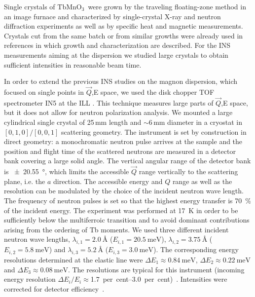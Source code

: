 \documentclass[aps,prb,twocolumn,superscriptaddress,showpacs,floatfix]{revtex4-2}
\newcommand{\tbmno}{TbMnO$_3$}
\begin{document}
Single crystals of \tbmno \ were grown by the traveling floating-zone method in an image furnace \cite{Reutler2003,diss_komarek} and characterized by single-crystal X-ray \cite{struc-baum} and neutron diffraction experiments as well as by specific heat and magnetic measurements. Crystals cut from the same batch or from similar growths were already used in references  in which growth and characterization are described. For the INS measurements aiming at the dispersion we studied large
crystals to obtain sufficient intensities in reasonable beam time.

In order to extend the previous INS studies on the magnon dispersion, which focused on single points in $\vec{Q}$,E space, we used  the disk chopper TOF spectrometer IN5 at the ILL \cite{data-4-01-1230}.
This technique measures large parts of $\vec{Q}$,E space, but it does not allow for neutron polarization analysis.
We mounted a large cylindrical single crystal of 25\,mm length and $\sim$6\,mm diameter in a cryostat in $[0,1,0]/[0,0,1]$ scattering geometry.
The instrument is set by construction in direct geometry: a monochromatic neutron pulse arrives at the sample and the position and flight time of the scattered neutrons are measured in a  detector bank covering a large solid angle. The vertical angular range of the detector bank is \SI{\pm20.55}{\degree}, which limits the accessible $\vec{Q}$ range vertically to the scattering plane, i.e. the $a$ direction.
The accessible energy and $Q$ range as well as the resolution can be modulated by the choice of the incident neutron wave length. The frequency of neutron pulses is set so that the highest energy transfer is \SI{70}{\percent} of the incident energy. The experiment was performed at \SI{17}{\kelvin} in order to be sufficiently below the multiferroic transition and to avoid dominant contributions arising from the ordering of Tb moments. We used three different incident neutron wave lengths, $\lambda_{i,1}=\SI{2.0}{\angstrom}$ ($E_{i,1}=\SI{20.5}{\meV}$), $\lambda_{i,2}=\SI{3.75}{\angstrom}$ ($E_{i,2}=\SI{5.8}{\meV}$) and $\lambda_{i,3}=\SI{5.2}{\angstrom}$ ($E_{i,3}=\SI{3.0}{\meV}$). The corresponding energy resolutions determined at the elastic line were $\Delta E_1\approx\SI{0.84}{\meV}$, $\Delta E_2\approx\SI{0.22}{\meV}$ and $\Delta E_3\approx\SI{0.08}{\meV}$. The resolutions are typical for this instrument (incoming energy resolution $\Delta E_i/E_i\approx$\SIrange{1.7}{3.0}{ per cent})~\cite{Ollivier2011}. Intensities were corrected for detector efficiency~\cite{Richard1996}.
\end{document}
